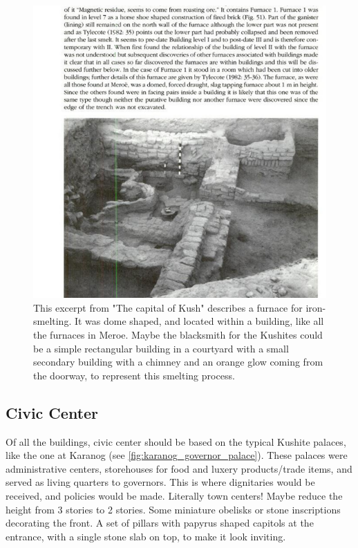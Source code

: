 \documentclass[a4paper,12pt]{scrreprt}
\begin{document}
\begin{figure}[H]
	\centering
	\includegraphics[width=\textwidth]{img/blacksmith/blacksmith_layout}
	\caption{This excerpt from "The capital of Kush" describes a furnace for iron-smelting. It was dome shaped, and located within a building, like all the furnaces in Meroe. Maybe the blacksmith for the Kushites could be a simple rectangular building in a courtyard with a small secondary building with a chimney and an orange glow coming from the doorway, to represent this smelting process.  }
\end{figure}

\subsection{Civic Center}

Of all the buildings, civic center should be based on the typical Kushite palaces, like the one at Karanog (see \ref{fig:karanog_governor_palace}). These palaces were administrative centers, storehouses for food and luxery products/trade items, and served as living quarters to governors. This is where dignitaries would be received, and policies would be made. Literally town centers! Maybe reduce the height from 3 stories to 2 stories. Some miniature obelisks or stone inscriptions decorating the front. A set of pillars with papyrus shaped capitols at the entrance, with a single stone slab on top, to make it look inviting. 
\end{document}
